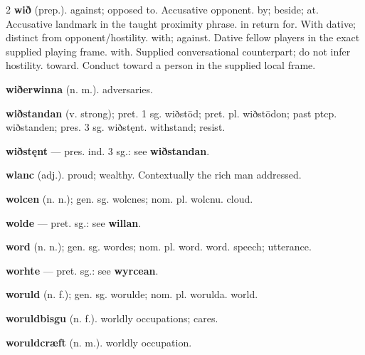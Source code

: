 \begin{multicols*}{2}
\textbf{wið} (prep.). against; opposed to. Accusative opponent. by; beside; at. Accusative landmark in the taught proximity phrase. in return for. With dative; distinct from opponent/hostility. with; against. Dative fellow players in the exact supplied playing frame. with. Supplied conversational counterpart; do not infer hostility. toward. Conduct toward a person in the supplied local frame.\par
\textbf{wiðerwinna} (n. m.). adversaries.\par
\textbf{wiðstandan} (v. strong); pret. 1 sg. wiðstōd; pret. pl. wiðstōdon; past ptcp. wiðstanden; pres. 3 sg. wiðstęnt. withstand; resist.\par
\textbf{wiðstęnt} — pres. ind. 3 sg.: see \textbf{wiðstandan}.\par
\textbf{wlanc} (adj.). proud; wealthy. Contextually the rich man addressed.\par
\textbf{wolcen} (n. n.); gen. sg. wolcnes; nom. pl. wolcnu. cloud.\par
\textbf{wolde} — pret. sg.: see \textbf{willan}.\par
\textbf{word} (n. n.); gen. sg. wordes; nom. pl. word. word. speech; utterance.\par
\textbf{worhte} — pret. sg.: see \textbf{wyrcean}.\par
\textbf{woruld} (n. f.); gen. sg. worulde; nom. pl. worulda. world.\par
\textbf{woruldbisgu} (n. f.). worldly occupations; cares.\par
\textbf{woruldcræft} (n. m.). worldly occupation.\par

\end{multicols*}
